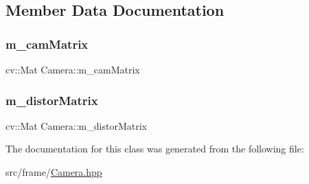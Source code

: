\subsection{Member Data Documentation}
\mbox{\label{classCamera_a1a20cdb75b56f843febf9bcfceeed9ff}} 
\subsubsection{\texorpdfstring{m\+\_\+cam\+Matrix}{m\_camMatrix}}
{\footnotesize\ttfamily cv\+::\+Mat Camera\+::m\+\_\+cam\+Matrix}

\mbox{\label{classCamera_a1bdef6fb4df5f4b40d3f6e50b027348a}} 
\subsubsection{\texorpdfstring{m\+\_\+distor\+Matrix}{m\_distorMatrix}}
{\footnotesize\ttfamily cv\+::\+Mat Camera\+::m\+\_\+distor\+Matrix}



The documentation for this class was generated from the following file\+:\begin{DoxyCompactItemize}
\item 
src/frame/\hyperlink{Camera_8hpp}{Camera.\+hpp}\end{DoxyCompactItemize}
